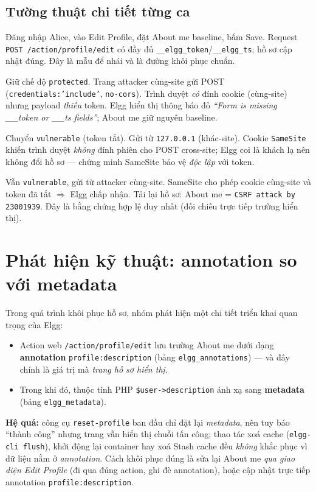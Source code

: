 \documentclass[11pt,a4paper]{article}
\begin{document}
\subsection{Tường thuật chi tiết từng ca}
\begin{description}[leftmargin=1.6em,style=nextline]
  \item[TC-B01 — Đăng nhập \& Save hợp lệ.] Đăng nhập Alice, vào Edit Profile, đặt About me baseline, bấm Save. Request \texttt{POST /action/profile/edit} có đầy đủ \texttt{\_\_elgg\_token}/\texttt{\_\_elgg\_ts}; hồ sơ cập nhật đúng. Đây là mẫu để nhái và là đường khôi phục chuẩn.
  \item[TC-B04 — Protected chặn tấn công.] Giữ chế độ \texttt{protected}. Trang attacker cùng-site gửi POST (\texttt{credentials:'include'}, \texttt{no-cors}). Trình duyệt \emph{có} đính cookie (cùng-site) nhưng payload \emph{thiếu} token. Elgg hiển thị thông báo đỏ \emph{``Form is missing \_\_token or \_\_ts fields''}; About me giữ nguyên baseline.
  \item[TC-B03 — SameSite chặn khác-site.] Chuyển \texttt{vulnerable} (token tắt). Gửi từ \texttt{127.0.0.1} (khác-site). Cookie \texttt{SameSite} khiến trình duyệt \emph{không} đính phiên cho POST cross-site; Elgg coi là khách lạ nên không đổi hồ sơ — chứng minh SameSite bảo vệ \emph{độc lập} với token.
  \item[TC-B05/06 — Tấn công thành công.] Vẫn \texttt{vulnerable}, gửi từ attacker cùng-site. SameSite cho phép cookie cùng-site và token đã tắt $\Rightarrow$ Elgg chấp nhận. Tải lại hồ sơ: About me = \texttt{CSRF attack by 23001939}. Đây là bằng chứng hợp lệ duy nhất (đối chiếu trực tiếp trường hiển thị).
\end{description}

\section{Phát hiện kỹ thuật: annotation so với metadata}
Trong quá trình khôi phục hồ sơ, nhóm phát hiện một chi tiết triển khai quan trọng của Elgg:
\begin{itemize}
  \item Action web \texttt{/action/profile/edit} lưu trường About me dưới dạng \textbf{annotation} \texttt{profile:description} (bảng \texttt{elgg\_annotations}) — và đây chính là giá trị mà \emph{trang hồ sơ hiển thị}.
  \item Trong khi đó, thuộc tính PHP \texttt{\$user->description} ánh xạ sang \textbf{metadata} (bảng \texttt{elgg\_metadata}).
\end{itemize}
\textbf{Hệ quả:} công cụ \texttt{reset-profile} ban đầu chỉ đặt lại \emph{metadata}, nên tuy báo ``thành công'' nhưng trang vẫn hiển thị chuỗi tấn công; thao tác xoá cache (\texttt{elgg-cli flush}), khởi động lại container hay xoá Stash cache đều \emph{không} khắc phục vì dữ liệu nằm ở \emph{annotation}. Cách khôi phục đúng là sửa lại About me \emph{qua giao diện Edit Profile} (đi qua đúng action, ghi đè annotation), hoặc cập nhật trực tiếp annotation \texttt{profile:description}.
\end{document}
